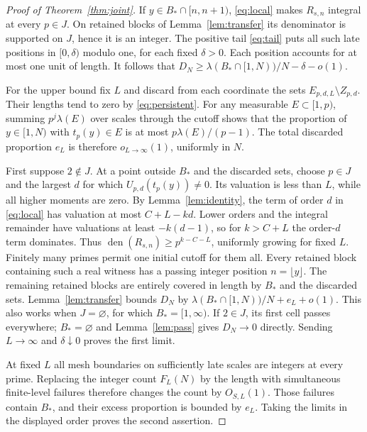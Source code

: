 \documentclass[11pt]{article}
\newcommand{\vol}{\lambda}
\newcommand{\den}{\operatorname{den}}
\begin{document}
\begin{proof}[Proof of Theorem~\ref{thm:joint}]
If \(y\in B_*\cap[n,n+1)\), \eqref{eq:local} makes \(R_{s,n}\) integral at every \(p\in J\). On retained blocks of Lemma~\ref{lem:transfer} its denominator is supported on \(J\), hence it is an integer. The positive tail \eqref{eq:tail} puts all such late positions in \([0,\delta)\) modulo one, for each fixed \(\delta>0\). Each position accounts for at most one unit of length. It follows that \(D_N\ge\vol(B_*\cap[1,N))/N-\delta-o(1)\).

For the upper bound fix \(L\) and discard from each coordinate the sets \(E_{p,d,L}\setminus Z_{p,d}\). Their lengths tend to zero by \eqref{eq:persistent}. For any measurable \(E\subset[1,p)\), summing \(p^j\vol(E)\) over scales through the cutoff shows that the proportion of \(y\in[1,N)\) with \(t_p(y)\in E\) is at most \(p\vol(E)/(p-1)\). The total discarded proportion \(e_L\) is therefore \(o_{L\to\infty}(1)\), uniformly in \(N\).

First suppose \(2\notin J\). At a point outside \(B_*\) and the discarded sets, choose \(p\in J\) and the largest \(d\) for which \(U_{p,d}(t_p(y))\ne0\). Its valuation is less than \(L\), while all higher moments are zero. By Lemma~\ref{lem:identity}, the term of order \(d\) in \eqref{eq:local} has valuation at most \(C+L-kd\). Lower orders and the integral remainder have valuations at least \(-k(d-1)\), so for \(k>C+L\) the order-\(d\) term dominates. Thus \(\den(R_{s,n})\ge p^{k-C-L}\), uniformly growing for fixed \(L\). Finitely many primes permit one initial cutoff for them all. Every retained block containing such a real witness has a passing integer position \(n=\lfloor y\rfloor\). The remaining retained blocks are entirely covered in length by \(B_*\) and the discarded sets. Lemma~\ref{lem:transfer} bounds \(D_N\) by \(\vol(B_*\cap[1,N))/N+e_L+o(1)\). This also works when \(J=\varnothing\), for which \(B_*=[1,\infty)\). If \(2\in J\), its first cell passes everywhere; \(B_*=\varnothing\) and Lemma~\ref{lem:pass} gives \(D_N\to0\) directly. Sending \(L\to\infty\) and \(\delta\downarrow0\) proves the first limit.

At fixed \(L\) all mesh boundaries on sufficiently late scales are integers at every prime. Replacing the integer count \(F_L(N)\) by the length with simultaneous finite-level failures therefore changes the count by \(O_{S,L}(1)\). Those failures contain \(B_*\), and their excess proportion is bounded by \(e_L\). Taking the limits in the displayed order proves the second assertion.
\end{proof}
\end{document}
